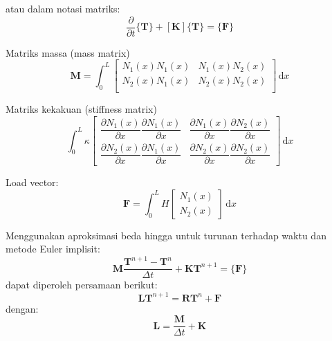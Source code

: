 atau dalam notasi matriks:
\begin{equation}
[ \mathbf{M} ] \frac{\partial}{\partial t} \{ \mathbf{T} \} +
[ \mathbf{K} ] \{ \mathbf{T} \} = \{ \mathbf{F} \}
\end{equation}

Matriks massa (mass matrix)
\begin{equation*}
\mathbf{M} = \int_{0}^{L}
\begin{bmatrix}
N_{1}(x) N_{1}(x) & N_{1}(x) N_{2}(x) \\[0.2cm]
N_{2}(x) N_{1}(x) & N_{2}(x) N_{2}(x) \\
\end{bmatrix}\, \mathrm{d}x
\end{equation*}

Matriks kekakuan (stiffness matrix)
\begin{equation*}
\int_{0}^{L} \kappa
\begin{bmatrix}
\dfrac{\partial N_{1}(x)}{\partial x} \dfrac{\partial N_{1}(x)}{\partial x} &
\dfrac{\partial N_{1}(x)}{\partial x} \dfrac{\partial N_{2}(x)}{\partial x} \\[0.25cm]
\dfrac{\partial N_{2}(x)}{\partial x} \dfrac{\partial N_{1}(x)}{\partial x} &
\dfrac{\partial N_{2}(x)}{\partial x} \dfrac{\partial N_{2}(x)}{\partial x}
\end{bmatrix} \, \mathrm{d}x
\end{equation*}

Load vector:
\begin{equation*}
\mathbf{F} = \int_{0}^{L} H \begin{bmatrix} N_{1}(x) \\ N_{2}(x) \end{bmatrix}\, \mathrm{d}x
\end{equation*}

Menggunakan aproksimasi beda hingga untuk turunan terhadap waktu dan metode
Euler implisit:
\begin{equation}
\mathbf{M} \frac{ \mathbf{T}^{n+1} - \mathbf{T}^{n}}{\Delta t} +
\mathbf{K} \mathbf{T}^{n+1} = \{ \mathbf{F} \}
\end{equation}
dapat diperoleh persamaan berikut:
\begin{equation*}
\mathbf{L} \mathbf{T}^{n+1} = \mathbf{R} \mathbf{T}^{n} + \mathbf{F}
\end{equation*}
dengan:
\begin{equation*}
\mathbf{L} = \frac{\mathbf{M}}{\Delta t} + \mathbf{K}
\end{equation*}

